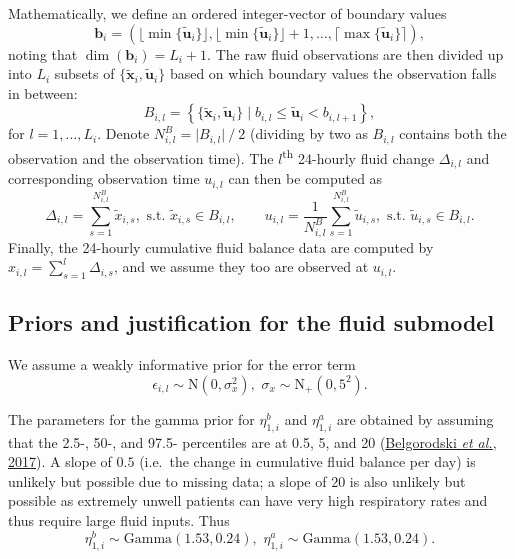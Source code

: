 \documentclass[
  10pt,
  a4paper,
]{article}
\begin{document}
Mathematically, we define an ordered integer-vector of boundary values
\begin{equation}
  \boldsymbol{b}_{i} = (\lfloor \min\{\tilde{\boldsymbol{u}}_{i}\} \rfloor,  \lfloor \min\{\tilde{\boldsymbol{u}}_{i}\} \rfloor + 1, \ldots, \lceil \max\{\tilde{\boldsymbol{u}}_{i}\} \rceil),
\end{equation} noting that \(\dim(\boldsymbol{b}_{i}) = L_{i} + 1\). The
raw fluid observations are then divided up into \(L_{i}\) subsets of
\(\{\tilde{\boldsymbol{x}}_{i}, \tilde{\boldsymbol{u}}_{i}\}\) based on
which boundary values the observation falls in between: \begin{equation}
  B_{i, l} = \left\{
    \{\tilde{\boldsymbol{x}}_{i}, \tilde{\boldsymbol{u}}_{i}\}
    \mid
    b_{i, l} \leq \tilde{\boldsymbol{u}}_{i} < b_{i, l + 1}
  \right\},
\end{equation} for \(l = 1, \ldots, L_{i}\). Denote
\(N^{B}_{i, l} = \lvert B_{i, l} \rvert \mathop{/} 2\) (dividing by two
as \(B_{i, l}\) contains both the observation and the observation time).
The \(l\)\textsuperscript{th} 24-hourly fluid change \(\Delta_{i, l}\)
and corresponding observation time \(u_{i, l}\) can then be computed as
\begin{equation}
  \Delta_{i, l} = \sum_{s = 1}^{N^{B}_{i, l}} \tilde{x}_{i, s}, \,\, \text{s.t.} \,\, \tilde{x}_{i, s} \in B_{i, l}, \qquad
  u_{i, l} = \frac{1}{N^{B}_{i, l}} \sum_{s = 1}^{N^{B}_{i, l}} \tilde{u}_{i, s}, \,\, \text{s.t.} \,\, \tilde{u}_{i, s} \in B_{i, l}.
\end{equation} Finally, the 24-hourly cumulative fluid balance data are
computed by \(x_{i, l} = \sum_{s = 1}^{l} \Delta_{i, s}\), and we assume
they too are observed at \(u_{i, l}\).

\hypertarget{priors-and-justification-for-the-fluid-submodel}{%
\subsection{Priors and justification for the fluid
submodel}\label{priors-and-justification-for-the-fluid-submodel}}

We assume a weakly informative prior for the error term \begin{equation}
  \epsilon_{i, l} \sim \text{N}(0, \sigma^{2}_{x}),  \,\, \sigma_{x} \sim \text{N}_{+}(0, 5^2).
\end{equation}

The parameters for the gamma prior for \(\eta^{b}_{1, i}\) and
\(\eta^{a}_{1, i}\) are obtained by assuming that the 2.5-, 50-, and
97.5- percentiles are at 0.5, 5, and 20
(\protect\hyperlink{ref-belgorodski_rriskdistributions_2017}{Belgorodski
\emph{et al.}, 2017}). A slope of \(0.5\) (i.e.~the change in cumulative
fluid balance per day) is unlikely but possible due to missing data; a
slope of \(20\) is also unlikely but possible as extremely unwell
patients can have very high respiratory rates and thus require large
fluid inputs. Thus \begin{equation}
  \eta^{b}_{1, i} \sim \text{Gamma}(1.53, 0.24), \,\, \eta^{a}_{1, i} \sim \text{Gamma}(1.53, 0.24).
\end{equation}
\end{document}
